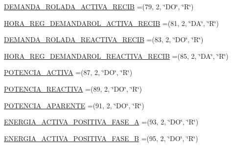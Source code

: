 \begin{DoxyCompactItemize}
\item 
\hyperlink{enumcom_1_1eneri_1_1scorpio__metertool_1_1devices_1_1_register_a095a580ab9ea22f911bbac1ba93091b7}{D\+E\+M\+A\+N\+D\+A\+\_\+\+R\+O\+L\+A\+D\+A\+\_\+\+A\+C\+T\+I\+V\+A\+\_\+\+R\+E\+C\+IB} =(79, 2, \char`\"{}DO\char`\"{}, \char`\"{}R\char`\"{})
\item 
\hyperlink{enumcom_1_1eneri_1_1scorpio__metertool_1_1devices_1_1_register_aaa71a4b6425c018abf3cdfa4b63aae17}{H\+O\+R\+A\+\_\+\+R\+E\+G\+\_\+\+D\+E\+M\+A\+N\+D\+A\+R\+O\+L\+\_\+\+A\+C\+T\+I\+V\+A\+\_\+\+R\+E\+C\+IB} =(81, 2, \char`\"{}DA\char`\"{}, \char`\"{}R\char`\"{})
\item 
\hyperlink{enumcom_1_1eneri_1_1scorpio__metertool_1_1devices_1_1_register_ae8b483e676b71e7692acdc6003c5fc20}{D\+E\+M\+A\+N\+D\+A\+\_\+\+R\+O\+L\+A\+D\+A\+\_\+\+R\+E\+A\+C\+T\+I\+V\+A\+\_\+\+R\+E\+C\+IB} =(83, 2, \char`\"{}DO\char`\"{}, \char`\"{}R\char`\"{})
\item 
\hyperlink{enumcom_1_1eneri_1_1scorpio__metertool_1_1devices_1_1_register_aa738636a95464e9ee18f33b288fd9674}{H\+O\+R\+A\+\_\+\+R\+E\+G\+\_\+\+D\+E\+M\+A\+N\+D\+A\+R\+O\+L\+\_\+\+R\+E\+A\+C\+T\+I\+V\+A\+\_\+\+R\+E\+C\+IB} =(85, 2, \char`\"{}DA\char`\"{}, \char`\"{}R\char`\"{})
\item 
\hyperlink{enumcom_1_1eneri_1_1scorpio__metertool_1_1devices_1_1_register_a7759dd65802d040ded463821d4806403}{P\+O\+T\+E\+N\+C\+I\+A\+\_\+\+A\+C\+T\+I\+VA} =(87, 2, \char`\"{}DO\char`\"{}, \char`\"{}R\char`\"{})
\item 
\hyperlink{enumcom_1_1eneri_1_1scorpio__metertool_1_1devices_1_1_register_af03677ed5051e037e10331b5289e424c}{P\+O\+T\+E\+N\+C\+I\+A\+\_\+\+R\+E\+A\+C\+T\+I\+VA} =(89, 2, \char`\"{}DO\char`\"{}, \char`\"{}R\char`\"{})
\item 
\hyperlink{enumcom_1_1eneri_1_1scorpio__metertool_1_1devices_1_1_register_a36acf944da86bc50fe4b253bafbf6d34}{P\+O\+T\+E\+N\+C\+I\+A\+\_\+\+A\+P\+A\+R\+E\+N\+TE} =(91, 2, \char`\"{}DO\char`\"{}, \char`\"{}R\char`\"{})
\item 
\hyperlink{enumcom_1_1eneri_1_1scorpio__metertool_1_1devices_1_1_register_aca7a8d72b7273fbe8585e55a2fc45047}{E\+N\+E\+R\+G\+I\+A\+\_\+\+A\+C\+T\+I\+V\+A\+\_\+\+P\+O\+S\+I\+T\+I\+V\+A\+\_\+\+F\+A\+S\+E\+\_\+A} =(93, 2, \char`\"{}DO\char`\"{}, \char`\"{}R\char`\"{})
\item 
\hyperlink{enumcom_1_1eneri_1_1scorpio__metertool_1_1devices_1_1_register_a3e9bf2956f8c7922f3f4fa798bb55449}{E\+N\+E\+R\+G\+I\+A\+\_\+\+A\+C\+T\+I\+V\+A\+\_\+\+P\+O\+S\+I\+T\+I\+V\+A\+\_\+\+F\+A\+S\+E\+\_\+B} =(95, 2, \char`\"{}DO\char`\"{}, \char`\"{}R\char`\"{})

\end{DoxyCompactItemize}
